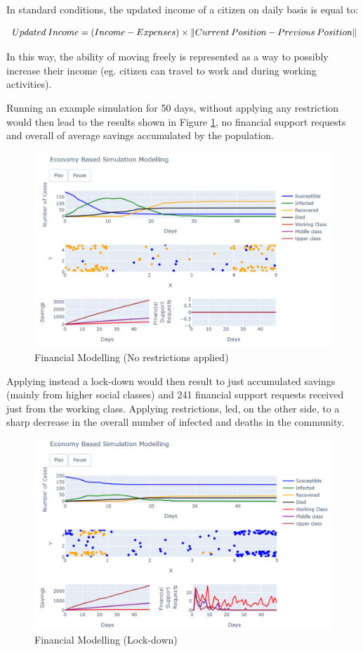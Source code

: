 In standard conditions, the updated income of a citizen on daily basis is equal to:

\useshortskip
\begin{align}
\ Updated\:Income = (Income-Expenses)\times \norm{Current\:Position-Previous\:Position}
\end{align}
\useshortskip

In this way, the ability of moving freely is represented as a way to possibly increase their income (eg. citizen can travel to work and during working activities).

Running an example simulation for 50 days, without applying any restriction would then lead to the results shown in Figure \ref{fin1}, no financial support requests and overall  of average savings accumulated by the population.

\begin{figure}[ht!]%
    \centering
    \includegraphics[width=0.85\linewidth]{latex/images/fin1.pdf}
    \caption{Financial Modelling (No restrictions applied)}
    \label{fin1}
\end{figure}

Applying instead a lock-down would then result to just 
accumulated savings (mainly from higher social classes) and 241 financial support requests received just from the working class. Applying restrictions, led, on the other side, to a sharp decrease in the overall number of infected and deaths in the community.

\begin{figure}[ht!]%
    \centering
    \includegraphics[width=0.85\linewidth]{latex/images/fin2.pdf}
    \caption{Financial Modelling (Lock-down)}
    \label{fin2}
\end{figure}

